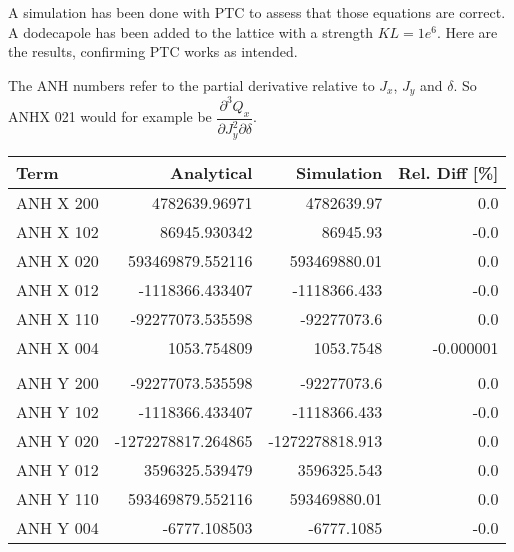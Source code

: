 \section{}
\label{ptc-check}

A simulation has been done with PTC to assess that those equations are
correct. A dodecapole has been added to the lattice with a strength
\(KL = 1e^6\). Here are the results, confirming PTC works as intended.

The ANH numbers refer to the partial derivative relative to \(J_x\),
\(J_y\) and \(\delta\). So ANHX 021 would for example be
\(\dfrac{\partial^3 Q_x}{\partial J_y^2 \partial \delta}\).

\begin{center}
\begin{tabular}{lrrr}
\toprule
       Term &         Analytical &      Simulation & Rel. Diff [\%] \\
\midrule
  ANH X 200 &      4782639.96971 &      4782639.97 &           0.0 \\
  ANH X 102 &       86945.930342 &        86945.93 &          -0.0 \\
  ANH X 020 &   593469879.552116 &    593469880.01 &           0.0 \\
  ANH X 012 &    -1118366.433407 &    -1118366.433 &          -0.0 \\
  ANH X 110 &   -92277073.535598 &     -92277073.6 &           0.0 \\
  ANH X 004 &        1053.754809 &       1053.7548 &     -0.000001 \\
            &                    &                 &               \\
  ANH Y 200 &   -92277073.535598 &     -92277073.6 &           0.0 \\
  ANH Y 102 &    -1118366.433407 &    -1118366.433 &          -0.0 \\
  ANH Y 020 & -1272278817.264865 & -1272278818.913 &           0.0 \\
  ANH Y 012 &     3596325.539479 &     3596325.543 &           0.0 \\
  ANH Y 110 &   593469879.552116 &    593469880.01 &           0.0 \\
  ANH Y 004 &       -6777.108503 &      -6777.1085 &          -0.0 \\
\bottomrule
\end{tabular}
\end{center}



